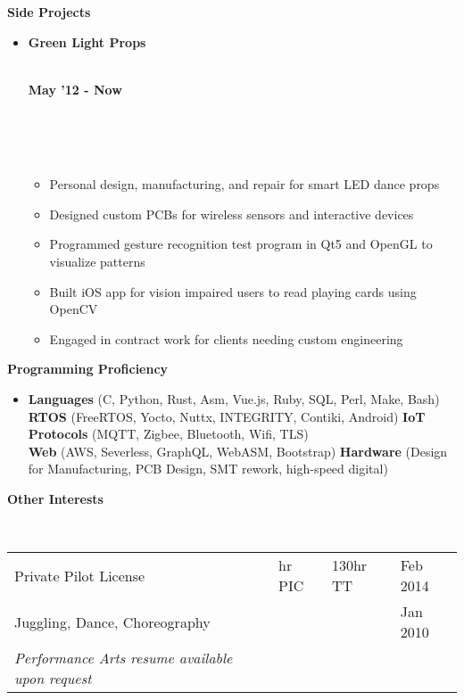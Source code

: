 \documentclass[a4paper,11pt]{article}
\newcommand{\isep}{0 pt}
\newcommand{\resheading}[1]{{\small \colorbox{mygrey}{\begin{minipage}{0.975\textwidth}{\textbf{#1 \vphantom{p\^{E}}}}\end{minipage}}}}
\newcommand{\workexp}[4]{
\begin{minipage}[t]{7cm}
\begin{flushleft}
\textbf{#1} \\
\indent \emph{#2}\\
\end{flushleft}
\end{minipage}
\hfill
\begin{minipage}[t]{7cm}
\begin{flushright}
\textbf{#3} \\
\indent #4 \\
\end{flushright}
\end{minipage}
\\[-0.10in]
}
\begin{document}

\resheading{\textbf{Side Projects}}

\begin{itemize}
\item \workexp{Green Light Props}{}{May '12 - Now}{}
\\[-0.3in]
	\begin{itemize} \itemsep \isep
	\item Personal design, manufacturing, and repair for smart LED dance props
	\item Designed custom PCBs for wireless sensors and interactive devices
	\item Programmed gesture recognition test program in Qt5 and OpenGL to visualize patterns
	\item Built iOS app for vision impaired users to read playing cards using OpenCV
	\item Engaged in contract work for clients needing custom engineering
	\end{itemize}
\end{itemize}



\resheading{\textbf{Programming Proficiency}}
\begin{itemize}
\item \noindent
    \textbf{Languages} (C, Python, Rust, Asm, Vue.js, Ruby, SQL, Perl, Make, Bash)
    \textbf{RTOS} (FreeRTOS, Yocto, Nuttx, INTEGRITY, Contiki, Android)
    \textbf{IoT Protocols} (MQTT, Zigbee, Bluetooth, Wifi, TLS) \\
    \textbf{Web} (AWS, Severless, GraphQL, WebASM, Bootstrap)
    \textbf{Hardware} (Design for Manufacturing, PCB Design, SMT rework, high-speed digital)
\end{itemize} 



\resheading{\textbf{Other Interests} }
\\[9pt]
\indent \begin{tabular}{   l  l  l  l } 
	\indent Private Pilot License & \indent 40 hr PIC & \indent 130hr TT  \indent & \indent Feb 2014\\
	\indent Juggling, Dance, Choreography \indent \indent \indent & \indent    & \indent  & \indent Jan 2010 \\
	\indent \indent \textit{Performance Arts resume available upon request}  \\
\end{tabular}

\end{document}
